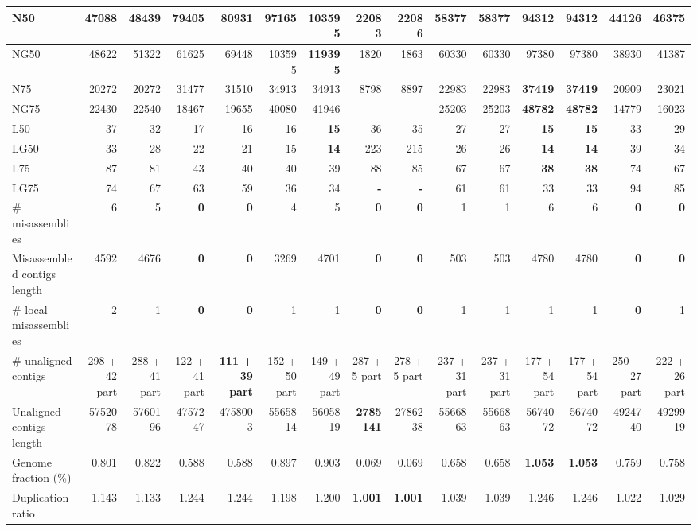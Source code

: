 \documentclass[12pt,a4paper]{article}
\begin{document}
\begin{table}[ht]
\begin{center}
\begin{tabular}{|l*{14}{|r}|}
N50 & 47088 & 48439 & 79405 & 80931 & 97165 & {\bf 103595} & 22083 & 22086 & 58377 & 58377 & 94312 & 94312 & 44126 & 46375 \\ \hline
NG50 & 48622 & 51322 & 61625 & 69448 & 103595 & {\bf 119395} & 1820 & 1863 & 60330 & 60330 & 97380 & 97380 & 38930 & 41387 \\ \hline
N75 & 20272 & 20272 & 31477 & 31510 & 34913 & 34913 & 8798 & 8897 & 22983 & 22983 & {\bf 37419} & {\bf 37419} & 20909 & 23021 \\ \hline
NG75 & 22430 & 22540 & 18467 & 19655 & 40080 & 41946 & - & - & 25203 & 25203 & {\bf 48782} & {\bf 48782} & 14779 & 16023 \\ \hline
L50 & 37 & 32 & 17 & 16 & 16 & {\bf 15} & 36 & 35 & 27 & 27 & {\bf 15} & {\bf 15} & 33 & 29 \\ \hline
LG50 & 33 & 28 & 22 & 21 & 15 & {\bf 14} & 223 & 215 & 26 & 26 & {\bf 14} & {\bf 14} & 39 & 34 \\ \hline
L75 & 87 & 81 & 43 & 40 & 40 & 39 & 88 & 85 & 67 & 67 & {\bf 38} & {\bf 38} & 74 & 67 \\ \hline
LG75 & 74 & 67 & 63 & 59 & 36 & 34 & {\bf -} & {\bf -} & 61 & 61 & 33 & 33 & 94 & 85 \\ \hline
\# misassemblies & 6 & 5 & {\bf 0} & {\bf 0} & 4 & 5 & {\bf 0} & {\bf 0} & 1 & 1 & 6 & 6 & {\bf 0} & {\bf 0} \\ \hline
Misassembled contigs length & 4592 & 4676 & {\bf 0} & {\bf 0} & 3269 & 4701 & {\bf 0} & {\bf 0} & 503 & 503 & 4780 & 4780 & {\bf 0} & {\bf 0} \\ \hline
\# local misassemblies & 2 & 1 & {\bf 0} & {\bf 0} & 1 & 1 & {\bf 0} & {\bf 0} & 1 & 1 & 1 & 1 & {\bf 0} & 1 \\ \hline
\# unaligned contigs & 298 + 42 part & 288 + 41 part & 122 + 41 part & {\bf 111 + 39 part} & 152 + 50 part & 149 + 49 part & 287 + 5 part & 278 + 5 part & 237 + 31 part & 237 + 31 part & 177 + 54 part & 177 + 54 part & 250 + 27 part & 222 + 26 part \\ \hline
Unaligned contigs length & 5752078 & 5760196 & 4757247 & 4758003 & 5565814 & 5605819 & {\bf 2785141} & 2786238 & 5566863 & 5566863 & 5674072 & 5674072 & 4924740 & 4929919 \\ \hline
Genome fraction (\%) & 0.801 & 0.822 & 0.588 & 0.588 & 0.897 & 0.903 & 0.069 & 0.069 & 0.658 & 0.658 & {\bf 1.053} & {\bf 1.053} & 0.759 & 0.758 \\ \hline
Duplication ratio & 1.143 & 1.133 & 1.244 & 1.244 & 1.198 & 1.200 & {\bf 1.001} & {\bf 1.001} & 1.039 & 1.039 & 1.246 & 1.246 & 1.022 & 1.029 \\ \hline

\end{tabular}
\end{center}
\end{table}
\end{document}
